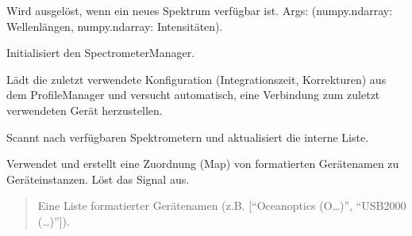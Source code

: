 \documentclass[letterpaper,10pt,english]{sphinxmanual}
\begin{document}
\begin{fulllineitems}
\begin{description}
\begin{description}
\sphinxAtStartPar
Wird ausgelöst, wenn ein neues Spektrum verfügbar ist.
Args: (numpy.ndarray: Wellenlängen, numpy.ndarray: Intensitäten).

\end{description}

\end{description}

\begin{fulllineitems}
\label{\detokenize{modulab/spectrometer_manager:modules.spectrometer.SpectrometerManager.SpectrometerManager.__init__}}
\pysigstartsignatures
\pysiglinewithargsret
{}
{\sphinxparamcomma {}}
{}
\pysigstopsignatures
\sphinxAtStartPar
Initialisiert den SpectrometerManager.

\sphinxAtStartPar
Lädt die zuletzt verwendete Konfiguration (Integrationszeit, Korrekturen)
aus dem ProfileManager und versucht automatisch, eine Verbindung
zum zuletzt verwendeten Gerät herzustellen.

\end{fulllineitems}


\begin{fulllineitems}
\label{\detokenize{modulab/spectrometer_manager:modules.spectrometer.SpectrometerManager.SpectrometerManager.get_deviceList}}
\pysigstartsignatures
\pysiglinewithargsret
{}
{}
{}
\pysigstopsignatures
\sphinxAtStartPar
Scannt nach verfügbaren Spektrometern und aktualisiert die interne Liste.

\sphinxAtStartPar
Verwendet  und erstellt eine Zuordnung (Map)
von formatierten Gerätenamen zu Geräteinstanzen. Löst das
\sphinxhyphen{}Signal aus.
\begin{quote}\begin{description}
\sphinxAtStartPar
Eine Liste formatierter Gerätenamen (z.B. {[}“Oceanoptics (O…)”, “USB2000 (…)”{]}).


\end{description}
\end{quote}
\end{fulllineitems}
\end{fulllineitems}
\end{document}
